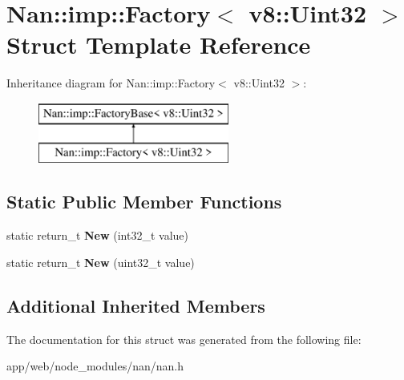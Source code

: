 \hypertarget{struct_nan_1_1imp_1_1_factory_3_01v8_1_1_uint32_01_4}{}\section{Nan\+:\+:imp\+:\+:Factory$<$ v8\+:\+:Uint32 $>$ Struct Template Reference}
\label{struct_nan_1_1imp_1_1_factory_3_01v8_1_1_uint32_01_4}
Inheritance diagram for Nan\+:\+:imp\+:\+:Factory$<$ v8\+:\+:Uint32 $>$\+:\begin{figure}[H]
\begin{center}
\leavevmode
\includegraphics[height=2.000000cm]{struct_nan_1_1imp_1_1_factory_3_01v8_1_1_uint32_01_4}
\end{center}
\end{figure}
\subsection*{Static Public Member Functions}
\begin{DoxyCompactItemize}
\item 
\mbox{\label{struct_nan_1_1imp_1_1_factory_3_01v8_1_1_uint32_01_4_ae9460ce37db4748a14c094cbb6112b0e}} 
static return\+\_\+t {\bfseries New} (int32\+\_\+t value)
\item 
\mbox{\label{struct_nan_1_1imp_1_1_factory_3_01v8_1_1_uint32_01_4_acfbe8a0b906e424c396b1c550ea3ac1d}} 
static return\+\_\+t {\bfseries New} (uint32\+\_\+t value)
\end{DoxyCompactItemize}
\subsection*{Additional Inherited Members}


The documentation for this struct was generated from the following file\+:\begin{DoxyCompactItemize}
\item 
app/web/node\+\_\+modules/nan/nan.\+h\end{DoxyCompactItemize}
